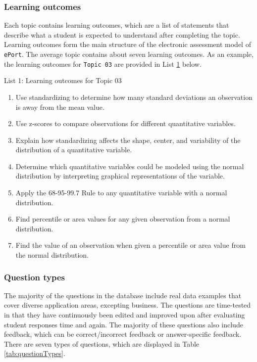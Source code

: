 \documentclass{article}\usepackage[]{graphicx}\usepackage[]{color}
\numberwithin{equation}{section} %
\begin{document}
\subsubsection{Learning outcomes}

Each topic contains learning outcomes, which are a list of statements that describe what a student is expected to understand after completing the topic. Learning outcomes form the main structure of the electronic assessment model of \texttt{ePort}. The average topic contains about seven learning outcomes. As an example, the learning outcomes for \texttt{Topic 03} are provided in List \hyperref[sec:lo]{1} below.

\newpage
\centerline{List 1: Learning outcomes for Topic 03}
\vspace{-2mm}
\begin{framed}
\begin{enumerate}[label=\Alph*.]
\label{sec:lo}
\item Use standardizing to determine how many standard deviations an observation is away from the mean value.
\item Use z-scores to compare observations for different quantitative variables.
\item Explain how standardizing affects the shape, center, and variability of the distribution of a quantitative variable.
\item Determine which quantitative variables could be modeled using the normal distribution by interpreting graphical representations of the variable.
\item Apply the 68-95-99.7 Rule to any quantitative variable with a normal distribution.
\item Find percentile or area values for any given observation from a normal distribution.
\item Find the value of an observation when given a percentile or area value from the normal distribution.
\end{enumerate}
\end{framed}

\subsubsection{Question types}

The majority of the questions in the database include real data examples that cover diverse application areas, excepting business. The questions are time-tested in that they have continuously been edited and improved upon after evaluating student responses time and again. The majority of these questions also include feedback, which can be correct/incorrect feedback or answer-specific feedback. There are seven types of questions, which are displayed in Table \ref{tab:questionTypes}.
\end{document}
